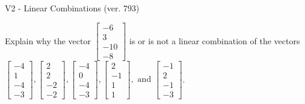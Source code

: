 \begin{exercise}
  \begin{exerciseTitle}V2 - Linear Combinations (ver. 793)\end{exerciseTitle}
  \begin{exerciseStatement}
    Explain why the vector \(\left[\begin{array}{c}
-6 \\
3 \\
-10 \\
-8
\end{array}\right]\)  is or is not a linear 
	combination of the vectors \(\left[\begin{array}{c}
-4 \\
1 \\
-4 \\
-3
\end{array}\right] , \left[\begin{array}{c}
2 \\
2 \\
-2 \\
-2
\end{array}\right] , \left[\begin{array}{c}
-4 \\
0 \\
-4 \\
-3
\end{array}\right] , \left[\begin{array}{c}
2 \\
-1 \\
1 \\
1
\end{array}\right] , \text{ and } \left[\begin{array}{c}
-1 \\
2 \\
-1 \\
-3
\end{array}\right]\).
	



\end{exerciseStatement}
\end{exercise}
